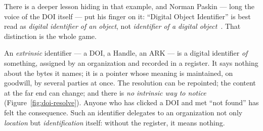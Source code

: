 There is a deeper lesson hiding in that example, and Norman Paskin --- long the voice of the DOI
itself --- put his finger on it: \enquote{Digital Object Identifier} is best read as \emph{digital
identifier of an object}, not \emph{identifier of a digital object}~\autocite{paskin2010digital}.
That distinction is the whole game.

An \emph{extrinsic} identifier --- a DOI, a Handle, an ARK --- is a digital identifier \emph{of}
something, assigned by an organization and recorded in a register. It says nothing about the bytes
it names; it is a pointer whose meaning is maintained, on goodwill, by several parties at once. The
resolution can be repointed; the content at the far end can change; and there is \emph{no intrinsic
way to notice}~\autocite{swhipres2018} (Figure~\ref{fig:doi-resolve}). Anyone who has clicked a DOI
and met \enquote{not found} has felt the consequence. Such an identifier delegates to an organization
not only \emph{location} but \emph{identification} itself: without the register, it means nothing.


